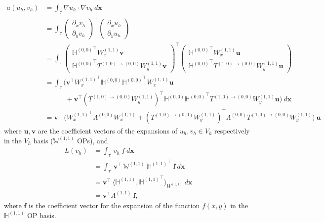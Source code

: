 \documentclass[11pt, oneside]{article}   	%
\newcommand{\hdop}{H}
\newcommand{\Wii}{W^{(1,1)}}
\newcommand{\bighdopii}{{\mathbb{\hdop}^{(1,1)}}}
\newcommand{\bighdopoo}{{\mathbb{\hdop}^{(0,0)}}}
\newcommand{\element}{\tau}
\newcommand{\bigWii}{{\mathbb{W}^{(1,1)}}}
\begin{document}
\begin{align*}
	a(u_h,v_h) &= \int_\element \nabla u_h \cdot \nabla v_h \: d\mathbf{x} \\
	&= \int_\element \begin{pmatrix}
					\partial_x v_h \\
					\partial_y v_h
				\end{pmatrix}^\top 
				\begin{pmatrix}
					\partial_x u_h \\
					\partial_y u_h
				\end{pmatrix}
				\\
	&= \int_\element \begin{pmatrix}
					\bighdopoo^\top \Wii_x \mathbf{v} \\
					\bighdopoo^\top T^{(1,0)\to(0,0)} \Wii_y \mathbf{v}
				\end{pmatrix}^\top 
				\begin{pmatrix}
					\bighdopoo^\top \Wii_x \mathbf{u} \\
					\bighdopoo^\top T^{(1,0)\to(0,0)} \Wii_y \mathbf{u}
				\end{pmatrix}
				\\
	&= \int_\element \Big( \mathbf{v}^\top {\Wii_x}^\top \bighdopoo \bighdopoo^\top \Wii_x \mathbf{u} \nonumber \\
					& \quad \quad \quad + \mathbf{v}^\top ({T^{(1,0)\to(0,0)} \Wii_y})^\top \bighdopoo \bighdopoo^\top T^{(1,0)\to(0,0)} \Wii_y \mathbf{u}  \Big) \: d\mathbf{x} \\
	&= \mathbf{v}^\top \: \Big( {\Wii_x}^\top \Lambda^{(0,0)} \Wii_x + ({T^{(1,0)\to(0,0)} \Wii_y})^\top \Lambda^{(0,0)} T^{(1,0)\to(0,0)} \Wii_y \Big) \: \mathbf{u}
\end{align*}
where $\mathbf{u}, \mathbf{v}$ are the coefficient vectors of the expansions of $u_h, v_h \in V_h$ respectively in the $V_h$ basis ($\bigWii$ OPs), and
\begin{align*}
	L(v_h) &= \int_\element \: v_h \: f \: d\mathbf{x} \\
	&= \int_\element \: \mathbf{v}^\top \: \bigWii \: \bighdopii^\top \: \mathbf{f} \: d\mathbf{x} \\
	&= \mathbf{v}^\top \: \langle \bighdopii, {\bighdopii}^\top \rangle_{\Wii} \: d\mathbf{x} \\
	&= \mathbf{v}^\top \Lambda^{(1,1)} \: \mathbf{f},
\end{align*}
where $\mathbf{f}$ is the coefficient vector for the expansion of the function $f(x,y)$ in the $\bighdopii$ OP basis.
\end{document}
